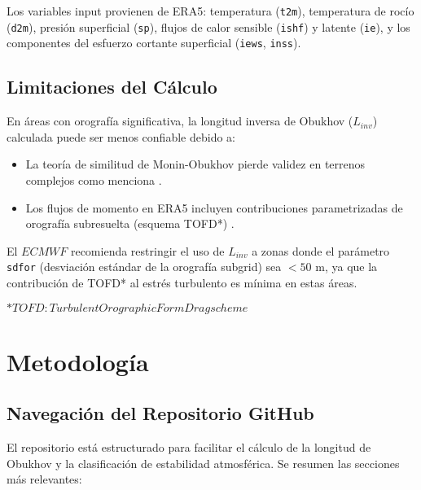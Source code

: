 \documentclass[11pt]{article}
\begin{document}
Los variables input provienen de ERA5: temperatura (\texttt{t2m}), temperatura de rocío (\texttt{d2m}), presión superficial (\texttt{sp}), flujos de calor sensible (\texttt{ishf}) y latente (\texttt{ie}), y los componentes del esfuerzo cortante superficial (\texttt{iews}, \texttt{inss}).

%

\subsection{Limitaciones del Cálculo}
\label{subsec:limitaciones}

En áreas con orografía significativa, la longitud inversa de Obukhov ($L_{inv}$) calculada puede ser menos confiable debido a:

\begin{itemize}
    \item La teoría de similitud de Monin-Obukhov pierde validez en terrenos complejos como menciona \citep{stull1988}.
    \item Los flujos de momento en ERA5 incluyen contribuciones parametrizadas de orografía subresuelta (esquema TOFD*) \citep{beljaars2004}.
\end{itemize}


El $ECMWF$ recomienda restringir el uso de $L_{inv}$ a zonas donde el parámetro \texttt{sdfor} (desviación estándar de la orografía subgrid) sea $< 50$ m, ya que la contribución de TOFD* al estrés turbulento es mínima en estas áreas.

$*TOFD: Turbulent Orographic Form Drag scheme$
\section{Metodología}
\subsection{Navegación del Repositorio GitHub}

El repositorio está estructurado para facilitar el cálculo de la longitud de Obukhov y la clasificación de estabilidad atmosférica. Se resumen las secciones más relevantes:
\end{document}
